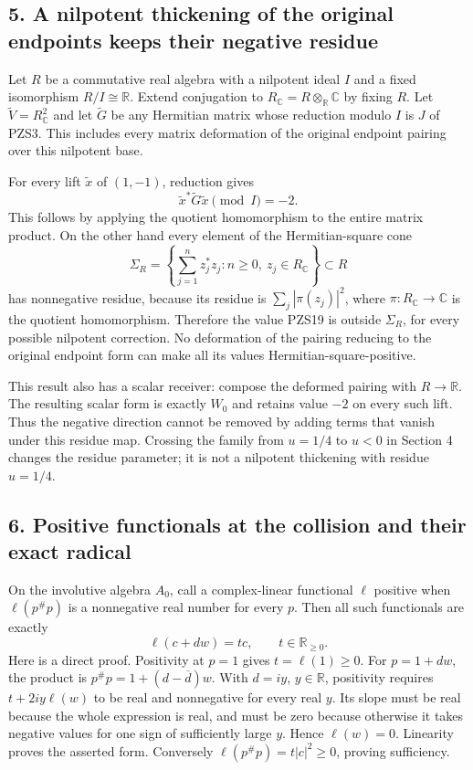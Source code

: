 \documentclass[
  10pt,
  a4paper,
]{article}
\begin{document}
\subsection{5. A nilpotent thickening of the original endpoints keeps
their negative
residue}\label{a-nilpotent-thickening-of-the-original-endpoints-keeps-their-negative-residue}

Let \(R\) be a commutative real algebra with a nilpotent ideal \(I\) and
a fixed isomorphism \(R/I\cong\mathbb R\). Extend conjugation to
\(R_{\mathbb C}=R\otimes_{\mathbb R}\mathbb C\) by fixing \(R\). Let
\(\widetilde V=R_{\mathbb C}^2\) and let \(\widetilde G\) be any
Hermitian matrix whose reduction modulo \(I\) is \(J\) of PZS3. This
includes every matrix deformation of the original endpoint pairing over
this nilpotent base.

For every lift \(\widetilde x\) of \((1,-1)\), reduction gives \[
\widetilde x^*\widetilde G\widetilde x\pmod I=-2.
\tag{PZS19}
\] This follows by applying the quotient homomorphism to the entire
matrix product. On the other hand every element of the Hermitian-square
cone \[
\Sigma_R=\left\{\sum_{j=1}^n z_j^*z_j:
n\ge0,\ z_j\in R_{\mathbb C}\right\}\subset R
\tag{PZS20}
\] has nonnegative residue, because its residue is
\(\sum_j|\pi(z_j)|^2\), where \(\pi:R_{\mathbb C}\to\mathbb C\) is the
quotient homomorphism. Therefore the value PZS19 is outside
\(\Sigma_R\), for every possible nilpotent correction. No deformation of
the pairing reducing to the original endpoint form can make all its
values Hermitian-square-positive.

This result also has a scalar receiver: compose the deformed pairing
with \(R\to\mathbb R\). The resulting scalar form is exactly \(W_0\) and
retains value \(-2\) on every such lift. Thus the negative direction
cannot be removed by adding terms that vanish under this residue map.
Crossing the family from \(u=1/4\) to \(u<0\) in Section 4 changes the
residue parameter; it is not a nilpotent thickening with residue
\(u=1/4\).

\subsection{6. Positive functionals at the collision and their exact
radical}\label{positive-functionals-at-the-collision-and-their-exact-radical}

On the involutive algebra \(A_0\), call a complex-linear functional
\(\ell\) positive when \(\ell(p^\#p)\) is a nonnegative real number for
every \(p\). Then all such functionals are exactly \[
\ell(c+dw)=t c,\qquad t\in\mathbb R_{\ge0}.
\tag{PZS21}
\] Here is a direct proof. Positivity at \(p=1\) gives
\(t=\ell(1)\ge0\). For \(p=1+dw\), the product is
\(p^\#p=1+(d-\overline d)w\). With \(d=i y\), \(y\in\mathbb R\),
positivity requires \(t+2iy\ell(w)\) to be real and nonnegative for
every real \(y\). Its slope must be real because the whole expression is
real, and must be zero because otherwise it takes negative values for
one sign of sufficiently large \(y\). Hence \(\ell(w)=0\). Linearity
proves the asserted form. Conversely \(\ell(p^\#p)=t|c|^2\ge0\), proving
sufficiency.
\end{document}
